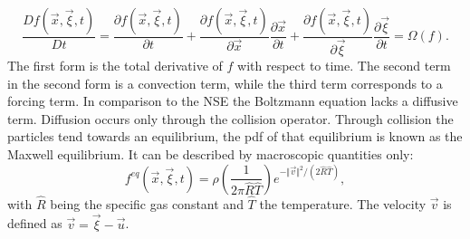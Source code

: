 \begin{equation}
	\frac{D f(\vec{x}, \vec{\xi}, t)}{Dt} = \frac{ \partial f(\vec{x}, \vec{\xi}, t)}{\partial t} + \frac{ \partial f(\vec{x}, \vec{\xi}, t)}{\partial\vec{x}} \frac{\partial \vec{x}}{\partial t} + \frac{ \partial f(\vec{x}, \vec{\xi}, t)}{\partial \vec{\xi}} \frac{\partial \vec{\xi}}{\partial t} =  \Omega(f). \label{eq:boltzmann}
\end{equation}
 The first form is the total derivative of $f$ with respect to time. The second term in the second form is a convection term, while the third term corresponds to a forcing term. In comparison to the NSE the Boltzmann equation lacks a diffusive term. Diffusion occurs only through the collision operator. Through collision the particles tend towards an equilibrium, the pdf of that equilibrium is known as the Maxwell equilibrium. It can be described by macroscopic quantities only:
\begin{equation}
	f^{eq} (\vec{x}, \vec{\xi}, t) = \rho\left(\frac{1}{2 \pi \hat{R}\hat{T}}\right) e^{-\Vert \vec{v} \Vert^2/(2\hat{R}\hat{T}) }, \label{eq:equilibrium}
\end{equation}
with $\hat{R}$ being the specific gas constant and $\hat{T}$ the temperature. The velocity $\vec{v}$ is defined as $\vec{v} = \vec{\xi}-\vec{u}$. \cite[p. 15- 21]{kruger_lattice_2017} \\
